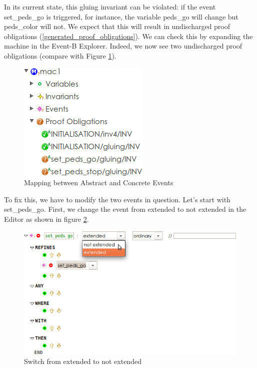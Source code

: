 
In its current state, this gluing invariant can be violated: if the event \textsf{set\_peds\_go} is triggered, for instance, the variable \textsf{peds\_go} will change but \textsf{peds\_color} will not.  We expect that this will result in undischarged proof obligations (\ref{generated_proof_obligations}).  We can check this by expanding the machine in the Event-B Explorer.  Indeed, we now see two undischarged proof obligations (compare with Figure \ref{fig_tut_07_undischarged}).

\begin{figure}[!ht]
\begin{center}
	\includegraphics{img/tutorial/undischarged1.png}
	\caption{Mapping between Abstract and Concrete Events}
	\label{fig_tut_07_undischarged}
\end{center}
\end{figure}

To fix this, we have to modify the two events in question.  Let's start with \textsf{set\_peds\_go}.  First, we change the event from extended to not extended in the Editor as shown in figure \ref{fig_tut_07_event_refinement}.

\begin{figure}[!ht]
\begin{center}
	\includegraphics{img/tutorial/event-refinement.png}
	\caption{Switch from extended to not extended}
	\label{fig_tut_07_event_refinement}
\end{center}
\end{figure}

